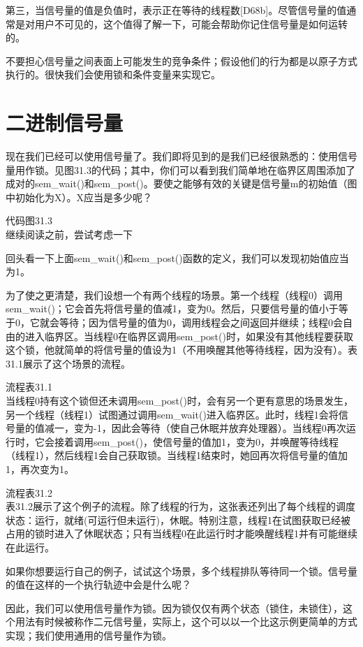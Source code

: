 第三，当信号量的值是负值时，表示正在等待的线程数[D68b]。尽管信号量的值通常是对用户不可见的，这个值得了解一下，可能会帮助你记住信号量是如何运转的。

不要担心信号量之间表面上可能发生的竞争条件；假设他们的行为都是以原子方式执行的。很快我们会使用锁和条件变量来实现它。


\section{二进制信号量}
现在我们已经可以使用信号量了。我们即将见到的是我们已经很熟悉的：使用信号量用作锁。见图31.3的代码；其中，你们可以看到我们简单地在临界区周围添加了成对的sem\_wait()和sem\_post()。要使之能够有效的关键是信号量m的初始值（图中初始化为X）。X应当是多少呢？

代码图31.3\\

继续阅读之前，尝试考虑一下

回头看一下上面sem\_wait()和sem\_post()函数的定义，我们可以发现初始值应当为1。

为了使之更清楚，我们设想一个有两个线程的场景。第一个线程（线程0）调用sem\_wait()；它会首先将信号量的值减1，变为0。然后，只要信号量的值小于等于0，它就会等待；因为信号量的值为0，调用线程会之间返回并继续；线程0会自由的进入临界区。当线程0在临界区调用sem\_post()时，如果没有其他线程要获取这个锁，他就简单的将信号量的值设为1（不用唤醒其他等待线程，因为没有）。表31.1展示了这个场景的流程。

流程表31.1\\

当线程0持有这个锁但还未调用sem\_post()时，会有另一个更有意思的场景发生，另一个线程（线程1）试图通过调用sem\_wait()进入临界区。此时，线程1会将信号量的值减一，变为-1，因此会等待（使自己休眠并放弃处理器）。当线程0再次运行时，它会接着调用sem\_post()，使信号量的值加1，变为0，并唤醒等待线程（线程1），然后线程1会自己获取锁。当线程1结束时，她回再次将信号量的值加1，再次变为1。

流程表31.2\\

表31.2展示了这个例子的流程。除了线程的行为，这张表还列出了每个线程的调度状态：运行，就绪(可运行但未运行)，休眠。特别注意，线程1在试图获取已经被占用的锁时进入了休眠状态；只有当线程0在此运行时才能唤醒线程1并有可能继续在此运行。

如果你想要运行自己的例子，试试这个场景，多个线程排队等待同一个锁。信号量的值在这样的一个执行轨迹中会是什么呢？

因此，我们可以使用信号量作为锁。因为锁仅仅有两个状态（锁住，未锁住），这个用法有时候被称作二元信号量，实际上，这个可以以一个比这示例更简单的方式实现；我们使用通用的信号量作为锁。


